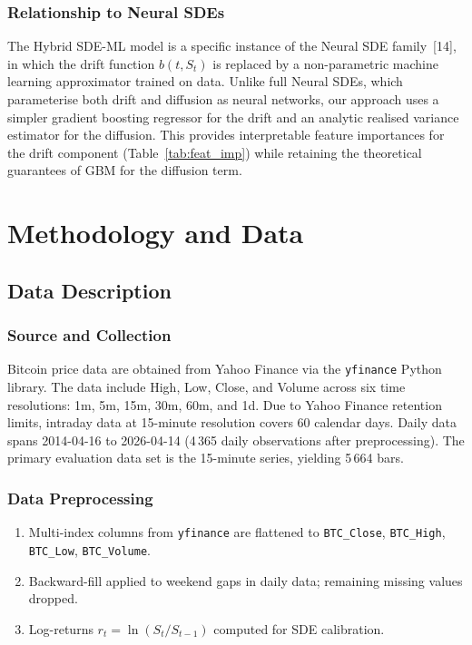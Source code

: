 \documentclass[12pt, a4paper, oneside]{report}
\theoremstyle{plain}
\theoremstyle{definition}
\theoremstyle{remark}
\begin{document}
\subsection{Relationship to Neural SDEs}

The Hybrid SDE-ML model is a specific instance of the Neural SDE family~[14],
in which the drift function $b(t, S_t)$ is replaced by a non-parametric
machine learning approximator trained on data.  Unlike full Neural SDEs, which
parameterise both drift and diffusion as neural networks, our approach uses a
simpler gradient boosting regressor for the drift and an analytic realised
variance estimator for the diffusion.  This provides interpretable feature
importances for the drift component (Table~\ref{tab:feat_imp}) while
retaining the theoretical guarantees of GBM for the diffusion term.

\chapter{Methodology and Data}
\label{ch:methodology}

\section{Data Description}

\subsection{Source and Collection}

Bitcoin price data are obtained from Yahoo Finance via the \texttt{yfinance}
Python library.  The data include High, Low, Close, and Volume across six time
resolutions: 1m, 5m, 15m, 30m, 60m, and 1d.  Due to Yahoo Finance retention
limits, intraday data at 15-minute resolution covers 60 calendar days.  Daily
data spans 2014-04-16 to 2026-04-14 (4\,365 daily observations after
preprocessing).  The primary
evaluation data set is the 15-minute series, yielding 5\,664 bars.

\subsection{Data Preprocessing}

\begin{enumerate}[leftmargin=1.25cm, label=\arabic*.]
  \item Multi-index columns from \texttt{yfinance} are flattened to
    \texttt{BTC\_Close}, \texttt{BTC\_High}, \texttt{BTC\_Low},
    \texttt{BTC\_Volume}.
  \item Backward-fill applied to weekend gaps in daily data; remaining
    missing values dropped.
  \item Log-returns $r_t = \ln(S_t/S_{t-1})$ computed for SDE calibration.
\end{enumerate}
\end{document}
